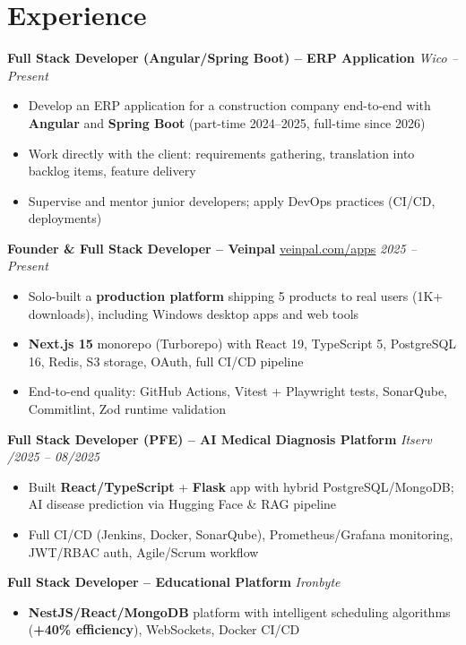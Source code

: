 \documentclass[10pt,a4paper]{article}
\begin{document}
\section*{Experience}
{\small

\textbf{Full Stack Developer (Angular/Spring Boot) -- ERP Application} \hfill \textit{Wico \;\textbar{} -- Present}
\begin{itemize}
  \item Develop an ERP application for a construction company end-to-end with \textbf{Angular} and \textbf{Spring Boot} (part-time 2024--2025, full-time since 2026)
  \item Work directly with the client: requirements gathering, translation into backlog items, feature delivery
  \item Supervise and mentor junior developers; apply DevOps practices (CI/CD, deployments)
\end{itemize}

\vspace{2pt}
\textbf{Founder \& Full Stack Developer -- Veinpal} \hfill \href{https://veinpal.com/apps}{veinpal.com/apps} \;\textbar\; \textit{2025 -- Present}
\begin{itemize}
  \item Solo-built a \textbf{production platform} shipping 5 products to real users (1K+ downloads), including Windows desktop apps and web tools
  \item \textbf{Next.js 15} monorepo (Turborepo) with React 19, TypeScript 5, PostgreSQL 16, Redis, S3 storage, OAuth, full CI/CD pipeline
  \item End-to-end quality: GitHub Actions, Vitest + Playwright tests, SonarQube, Commitlint, Zod runtime validation
\end{itemize}

\vspace{2pt}
\textbf{Full Stack Developer (PFE) -- AI Medical Diagnosis Platform} \hfill \textit{Itserv \;\textbar{}/2025 -- 08/2025}
\begin{itemize}
  \item Built \textbf{React/TypeScript} + \textbf{Flask} app with hybrid PostgreSQL/MongoDB; AI disease prediction via Hugging Face \& RAG pipeline
  \item Full CI/CD (Jenkins, Docker, SonarQube), Prometheus/Grafana monitoring, JWT/RBAC auth, Agile/Scrum workflow
\end{itemize}

\vspace{2pt}
\textbf{Full Stack Developer -- Educational Platform} \hfill \textit{Ironbyte \;\textbar{}}
\begin{itemize}
  \item \textbf{NestJS/React/MongoDB} platform with intelligent scheduling algorithms (\textbf{+40\% efficiency}), WebSockets, Docker CI/CD
\end{itemize}

}
\end{document}
